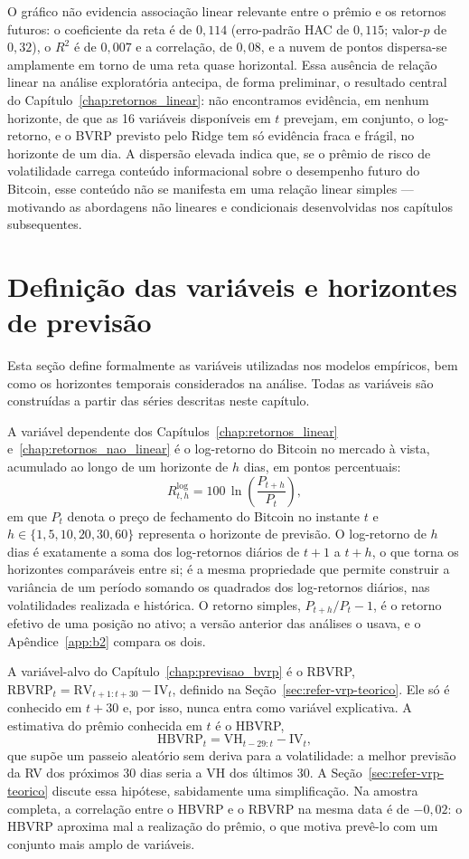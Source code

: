 O gráfico não evidencia associação linear relevante entre o prêmio e os
retornos futuros: o coeficiente da reta é de $0{,}114$ (erro-padrão HAC de
$0{,}115$; valor-$p$ de $0{,}32$), o $R^2$ é de $0{,}007$ e a correlação, de
$0{,}08$, e a nuvem de pontos dispersa-se amplamente em torno de uma reta quase
horizontal. Essa ausência de relação linear na análise exploratória antecipa,
de forma preliminar, o resultado central do Capítulo~\ref{chap:retornos_linear}:
não encontramos evidência, em nenhum horizonte, de que as 16 variáveis
disponíveis em $t$ prevejam, em conjunto, o log-retorno, e o BVRP previsto pelo Ridge tem só evidência fraca e
frágil, no horizonte de um dia. A dispersão
elevada indica que, se o prêmio de risco de volatilidade carrega conteúdo
informacional sobre o desempenho futuro do Bitcoin, esse conteúdo não se
manifesta em uma relação linear simples --- motivando as abordagens não
lineares e condicionais desenvolvidas nos capítulos subsequentes.

\section{Definição das variáveis e horizontes de previsão}
\label{sec:dados-variaveis}

Esta seção define formalmente as variáveis utilizadas nos modelos empíricos,
bem como os horizontes temporais considerados na análise. Todas as variáveis
são construídas a partir das séries descritas neste capítulo.

A variável dependente dos Capítulos~\ref{chap:retornos_linear}
e~\ref{chap:retornos_nao_linear} é o log-retorno do Bitcoin no mercado à
vista, acumulado ao longo de um horizonte de $h$ dias, em pontos percentuais:
\[
R^{\log}_{t,h} = 100 \, \ln\!\left(\frac{P_{t+h}}{P_t}\right),
\]
em que $P_t$ denota o preço de fechamento do Bitcoin no instante $t$ e
$h \in \{1, 5, 10, 20, 30, 60\}$ representa o horizonte de previsão. O
log-retorno de $h$ dias é exatamente a soma dos log-retornos diários de $t+1$
a $t+h$, o que torna os horizontes comparáveis entre si; é a mesma
propriedade que permite construir a variância de um período somando os
quadrados dos log-retornos diários, nas volatilidades realizada e histórica.
O retorno simples, $P_{t+h}/P_t - 1$, é o retorno efetivo de uma posição no
ativo; a versão anterior das análises o usava, e o Apêndice~\ref{app:b2}
compara os dois.

A variável-alvo do Capítulo~\ref{chap:previsao_bvrp} é o RBVRP,
$\text{RBVRP}_t = \text{RV}_{t+1:t+30} - \text{IV}_t$, definido na
Seção~\ref{sec:refer-vrp-teorico}. Ele só é conhecido em $t+30$ e, por isso, nunca
entra como variável explicativa. A estimativa do prêmio conhecida em $t$ é o
HBVRP,
\[
\text{HBVRP}_t = \text{VH}_{t-29:t} - \text{IV}_t,
\]
que supõe um passeio aleatório sem deriva para a volatilidade: a melhor
previsão da RV dos próximos 30 dias seria a VH dos últimos 30. A
Seção~\ref{sec:refer-vrp-teorico} discute essa hipótese, sabidamente uma
simplificação. Na amostra completa, a correlação entre o HBVRP e o RBVRP na
mesma data é de $-0{,}02$: o HBVRP aproxima mal a realização do prêmio, o que
motiva prevê-lo com um conjunto mais amplo de variáveis.

